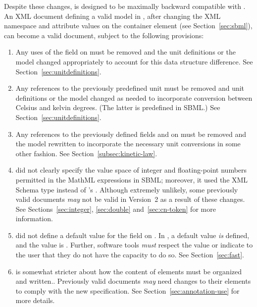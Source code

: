 Despite these changes, \sbmltwotwo is designed to be maximally
backward compatible with \sbmltwoone.  An XML document defining a
valid model in \sbmltwoone, after changing the XML namespace and
 attribute values on the  container
element (see Section~\ref{sec:sbml}), can become a valid
\sbmltwotwo document, subject to the following provisions:
\begin{enumerate}
  
\item Any uses of the field  on \UnitDefinition must
  be removed and the unit definitions or the model changed
  appropriately to account for this data structure difference.
  See Section~\ref{sec:unitdefinitions}.
  
\item Any references to the previously predefined unit
   must be removed and unit definitions or the model
  changed as needed to incorporate conversion between Celsius
  and kelvin degrees.  (The latter is predefined in SBML.)  See
  Section~\ref{sec:unitdefinitions}.
  
\item Any references to the previously defined fields
   and  on \KineticLaw
  must be removed and the model rewritten to incorporate the
  necessary unit conversions in some other fashion.  See
  Section~\ref{subsec:kinetic-law}.
  
\item \sbmltwoone did not clearly specify the value space of
  integer and floating-point numbers permitted in the MathML
  expressions in SBML; moreover, it used the XML Schema type
   instead of \sbmltwotwo's .  Although
  extremely unlikely, some previously valid \sbmltwoone documents
  \emph{may} not be valid in Version~2 as a result of these
  changes.  See Sections~\ref{sec:integer}, \ref{sec:double}
  and~\ref{sec:cn-token} for more information.

\item \sbmltwoone did not define a default value for the field
   on \Reaction.  In \sbmltwotwo, a default value
  \emph{is} defined, and the value is .  Further,
  software tools \emph{must} respect the value or indicate to the
  user that they do not have the capacity to do so.  See
  Section~\ref{sec:fast}.
  
\item \sbmltwotwo is somewhat stricter about how the content of
   elements must be organized and written..
  Previously valid \sbmltwoone documents \emph{may} need changes
  to their  elements to comply with the new
  specification.  See Section~\ref{sec:annotation-use} for more
  details.
  

\end{enumerate}
